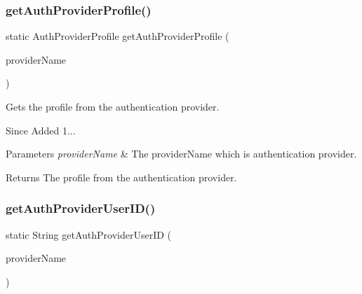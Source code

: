 \subsubsection{\texorpdfstring{get\+Auth\+Provider\+Profile()}{getAuthProviderProfile()}}
{\footnotesize\ttfamily static Auth\+Provider\+Profile get\+Auth\+Provider\+Profile (\begin{DoxyParamCaption}\item[{@Non\+Null String}]{provider\+Name }\end{DoxyParamCaption})\hspace{0.3cm}{\ttfamily [static]}}



Gets the profile from the authentication provider. 

\begin{DoxySince}{Since}
Added 1... 
\end{DoxySince}

\begin{DoxyParams}{Parameters}
{\em provider\+Name} & The provider\+Name which is authentication provider. \\
\hline
\end{DoxyParams}
\begin{DoxyReturn}{Returns}
The profile from the authentication provider. 
\end{DoxyReturn}
\mbox{\label{classcom_1_1toast_1_1android_1_1gamebase_1_1_gamebase_af1dc0a9194eff5829c859a6a6aa4ab7c}} 
\subsubsection{\texorpdfstring{get\+Auth\+Provider\+User\+I\+D()}{getAuthProviderUserID()}}
{\footnotesize\ttfamily static String get\+Auth\+Provider\+User\+ID (\begin{DoxyParamCaption}\item[{@Non\+Null String}]{provider\+Name }\end{DoxyParamCaption})\hspace{0.3cm}{\ttfamily [static]}}



